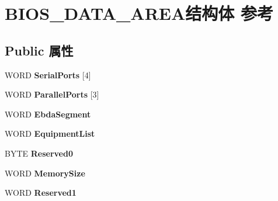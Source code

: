 \hypertarget{struct_b_i_o_s___d_a_t_a___a_r_e_a}{}\section{B\+I\+O\+S\+\_\+\+D\+A\+T\+A\+\_\+\+A\+R\+E\+A结构体 参考}
\label{struct_b_i_o_s___d_a_t_a___a_r_e_a}
\subsection*{Public 属性}
\begin{DoxyCompactItemize}
\item 
\mbox{\label{struct_b_i_o_s___d_a_t_a___a_r_e_a_a19d00eb28e27728482f89c067f78a238}} 
W\+O\+RD {\bfseries Serial\+Ports} \mbox{[}4\mbox{]}
\item 
\mbox{\label{struct_b_i_o_s___d_a_t_a___a_r_e_a_acb491470ad7fd20f291babf1fc5f203e}} 
W\+O\+RD {\bfseries Parallel\+Ports} \mbox{[}3\mbox{]}
\item 
\mbox{\label{struct_b_i_o_s___d_a_t_a___a_r_e_a_ac79e774890d0072bda1a6864d2bc8a43}} 
W\+O\+RD {\bfseries Ebda\+Segment}
\item 
\mbox{\label{struct_b_i_o_s___d_a_t_a___a_r_e_a_ac1549382e31d881ff2fce9de776590c9}} 
W\+O\+RD {\bfseries Equipment\+List}
\item 
\mbox{\label{struct_b_i_o_s___d_a_t_a___a_r_e_a_a649d1e372293c6e340ea83bcb1b65b2d}} 
B\+Y\+TE {\bfseries Reserved0}
\item 
\mbox{\label{struct_b_i_o_s___d_a_t_a___a_r_e_a_ab364fb3da58727e45d11ab09539d8233}} 
W\+O\+RD {\bfseries Memory\+Size}
\item 
\mbox{\label{struct_b_i_o_s___d_a_t_a___a_r_e_a_a9f2ff79aadea3e313bd3f7229bb1f6ab}} 
W\+O\+RD {\bfseries Reserved1}
\item 
\mbox{\label{struct_b_i_o_s___d_a_t_a___a_r_e_a_a97d9bc77746ad6ee989fb8604aa9898b}} 

\end{DoxyCompactItemize}
